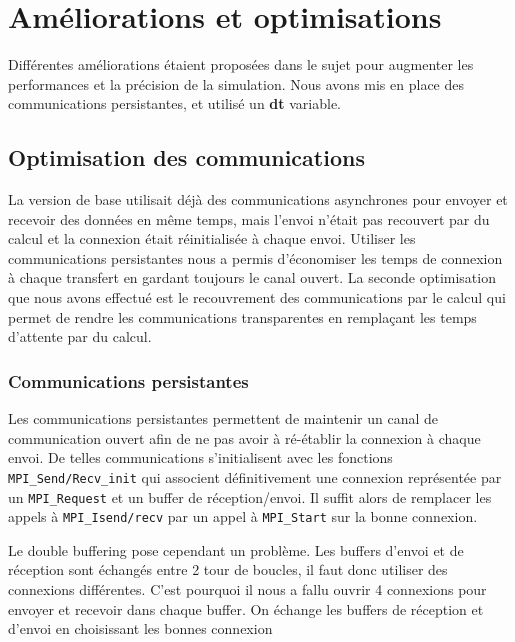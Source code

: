 \section{Améliorations et optimisations}

Différentes améliorations étaient proposées dans le sujet pour augmenter les performances et la précision de la simulation. Nous avons mis en place des communications persistantes, et utilisé un \textbf{dt} variable.

\subsection{Optimisation des communications}

La version de base utilisait déjà des communications asynchrones pour envoyer et recevoir des données en même temps, mais l'envoi n'était pas recouvert par du calcul et la connexion était réinitialisée à chaque envoi. Utiliser les communications persistantes nous a permis d'économiser les temps de connexion à chaque transfert en gardant toujours le canal ouvert. La seconde optimisation que nous avons effectué est le recouvrement des communications par le calcul qui permet de rendre les communications transparentes en remplaçant les temps d'attente par du calcul.

\subsubsection{Communications persistantes}

Les communications persistantes permettent de maintenir un canal de communication ouvert afin de ne pas avoir à ré-établir la connexion à chaque envoi. De telles communications s'initialisent avec les fonctions \texttt{MPI\_Send/Recv\_init} qui associent définitivement une connexion représentée par un \texttt{MPI\_Request} et un buffer de réception/envoi. Il suffit alors de remplacer les appels à \texttt{MPI\_Isend/recv} par un appel à \texttt{MPI\_Start} sur la bonne connexion.

Le double buffering pose cependant un problème. Les buffers d'envoi et de réception sont échangés entre 2 tour de boucles, il faut donc utiliser des connexions différentes. C'est pourquoi il nous a fallu ouvrir 4 connexions pour envoyer et recevoir dans chaque buffer. On échange les buffers de réception et d'envoi en choisissant les bonnes connexion


